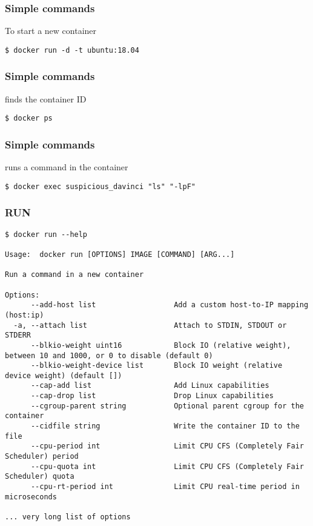 
\begin{frame}[fragile]
\frametitle{Simple commands}

To start a new container

\begin{lstlisting}
$ docker run -d -t ubuntu:18.04
\end{lstlisting}

\end{frame}

\begin{frame}[fragile]
\frametitle{Simple commands}

finds the container ID

\begin{lstlisting}
$ docker ps
\end{lstlisting}

\end{frame}

\begin{frame}[fragile]
\frametitle{Simple commands}

runs a command in the container
\begin{lstlisting}
$ docker exec suspicious_davinci "ls" "-lpF"
\end{lstlisting}
\end{frame}

\begin{frame}[fragile]
\frametitle{RUN}
\scriptsize
\begin{lstlisting}[breaklines=true]
$ docker run --help

Usage:  docker run [OPTIONS] IMAGE [COMMAND] [ARG...]

Run a command in a new container

Options:
      --add-host list                  Add a custom host-to-IP mapping (host:ip)
  -a, --attach list                    Attach to STDIN, STDOUT or STDERR
      --blkio-weight uint16            Block IO (relative weight), between 10 and 1000, or 0 to disable (default 0)
      --blkio-weight-device list       Block IO weight (relative device weight) (default [])
      --cap-add list                   Add Linux capabilities
      --cap-drop list                  Drop Linux capabilities
      --cgroup-parent string           Optional parent cgroup for the container
      --cidfile string                 Write the container ID to the file
      --cpu-period int                 Limit CPU CFS (Completely Fair Scheduler) period
      --cpu-quota int                  Limit CPU CFS (Completely Fair Scheduler) quota
      --cpu-rt-period int              Limit CPU real-time period in microseconds

... very long list of options
\end{lstlisting}
\normalsize
\end{frame}

